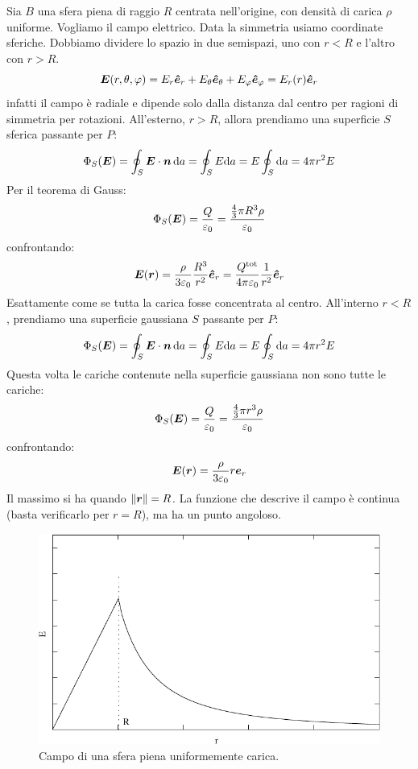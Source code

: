 \begin{Es}
  Sia $B$ una sfera piena di raggio $R$ centrata nell'origine, con densità di carica $\rho$ uniforme. Vogliamo il campo elettrico. Data la simmetria usiamo coordinate sferiche. Dobbiamo dividere lo spazio in due semispazi, uno con $r<R$ e l'altro con $r>R$.
  \[\boldsymbol{E}(r,\theta,\varphi)=E_r\boldsymbol{\hat {e}}_r+E_\theta\boldsymbol{\hat {e}}_\theta+E_\varphi \boldsymbol{\hat {e}}_\varphi=E_r(r)\boldsymbol{\hat {e}}_r\]
  infatti il campo è radiale e dipende solo dalla distanza dal centro per ragioni di simmetria per rotazioni.
  All'esterno, $r>R$, allora prendiamo una superficie $S$ sferica passante per $P$:
  \[\Phi_S(\boldsymbol{E})=\oint_S\boldsymbol{E}\cdot\boldsymbol{n}\,\mathrm{d} a=\oint_S E\mathrm{d} a=E\oint_S \mathrm{d} a=4\pi r^2 E\]
  Per il teorema di Gauss:
  \[\Phi_S(\boldsymbol{E})=\frac{Q}{\varepsilon_0}=\frac{\frac{4}{3}\pi R^3\rho}{\varepsilon_0}\]
  confrontando:
  \[\boldsymbol{E}(\boldsymbol{r})=\frac{\rho}{3\varepsilon_0}\frac{R^3}{r^2}\boldsymbol{\hat {e}}_r=\frac{Q^{\text{tot}}}{4\pi\varepsilon_0}\frac{1}{r^2}\boldsymbol{\hat {e}}_r\]
  Esattamente come se tutta la carica fosse concentrata al centro. All'interno $r<R$, prendiamo una superficie gaussiana $S$ passante per $P$:
  \[\Phi_S(\boldsymbol{E})=\oint_S\boldsymbol{E}\cdot\boldsymbol{n}\,\mathrm{d} a=\oint_S E\mathrm{d} a=E\oint_S \mathrm{d} a=4\pi r^2 E\]
  Questa volta le cariche contenute nella superficie gaussiana non sono tutte le cariche:
  \[\Phi_S(\boldsymbol{E})=\frac{Q}{\varepsilon_0}=\frac{\frac{4}{3}\pi r^3\rho}{\varepsilon_0}\]
  confrontando:
  \[\boldsymbol{E}(\boldsymbol{r})=\frac{\rho}{3\varepsilon_0}r\boldsymbol{e}_r\]
  Il massimo si ha quando $\left\lVert\boldsymbol{r}\right\rVert=R$. La funzione che descrive il campo è continua (basta verificarlo per $r=R$), ma ha un punto angoloso.
  \begin{figure}[htbp]
    \centering
    \includegraphics{immagini/fisica2/campo_sfera}
    \caption{Campo di una sfera piena uniformemente carica.}
  \end{figure}
\end{Es}
